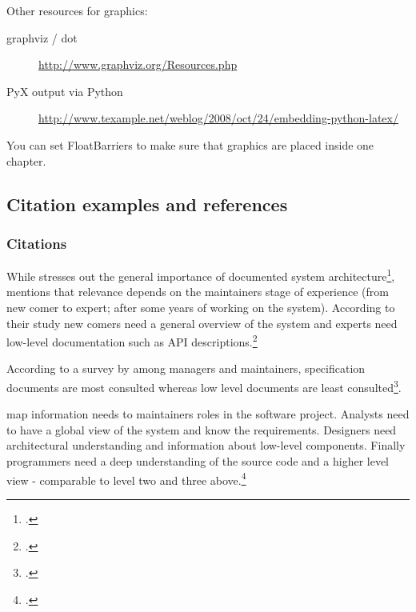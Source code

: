 Other resources for graphics:
\begin{description}
  \item[graphviz / dot] \url{http://www.graphviz.org/Resources.php}
  \item[PyX output via Python] \url{http://www.texample.net/weblog/2008/oct/24/embedding-python-latex/}
  \item[]
\end{description}

You can set FloatBarriers to make sure that graphics are placed inside one
chapter.

\FloatBarrier %
\newpage





\subsection{Citation examples and references}
\label{sec:citation}

\subsubsection{Citations}

While \citeauthor{tilley_1992} stresses out the general importance of documented
system architecture\footcite[Cf.][]{tilley_1992}, 
\citeauthor{cioch_96} mentions that relevance depends on the
maintainers stage of experience (from new comer to expert; after some years of
working on the system). According to their study new comers need a general
overview of the system and experts need low-level documentation such as API
descriptions.\footcite[Cf.][]{cioch_96}

According to a survey by \citeauthor{forward_relevance_2002} among managers and
maintainers, specification documents are most consulted whereas low level
documents are least consulted\footcite[Cf.][28-30]{forward_relevance_2002}.

\citeauthor{grubb2003software} map information needs to maintainers roles
in the software project. Analysts need to have a global view of the system and
know the requirements. Designers need architectural understanding and
information about low-level components. Finally programmers need a deep
understanding of the source code and a higher level view - comparable to level
two and three above.\footcite[Cf.][103-106]{grubb2003software}

